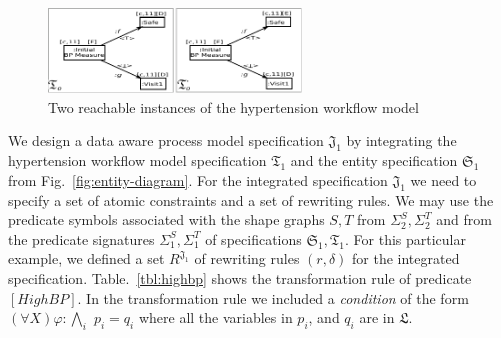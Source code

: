 \documentclass{eceasst}
\begin{document}
\begin{figure}[h]
\centering
 \includegraphics[width=0.6\textwidth]{bp-instances.pdf}
 \caption{Two reachable instances of the hypertension workflow model}
 \label{fig:bp-instance}
 \end{figure}

We design a data aware process model specification $\mathfrak{J}_1$ by integrating the hypertension workflow model specification $\mathfrak{T}_1$ and 
the entity specification $\mathfrak{S}_1$ from Fig.~\ref{fig:entity-diagram}. 
For the integrated specification $\mathfrak{J}_1$ we need to specify a set of atomic constraints and a set of rewriting rules. 
We may use the predicate symbols associated with the shape graphs $S, T$ from $\Sigma_2^S, \Sigma_2^T$ and from the predicate signatures $\Sigma_1^S, \Sigma_1^T$ of specifications 
$\mathfrak{S}_1, \mathfrak{T}_1$. For this particular example, we defined a set $R^{\mathfrak{J}_1}$ of rewriting rules $(r, \delta)$ for the integrated specification. 
Table.~\ref{tbl:highbp} shows the transformation rule of predicate $[HighBP]$. 
In the transformation rule we included a \textit{condition} of the form $(\forall X) \varphi : \bigwedge_i$ $p_i = q_i$ where all the variables in $p_i$, and $q_i$ are in $\mathfrak{L}$.
\end{document}
